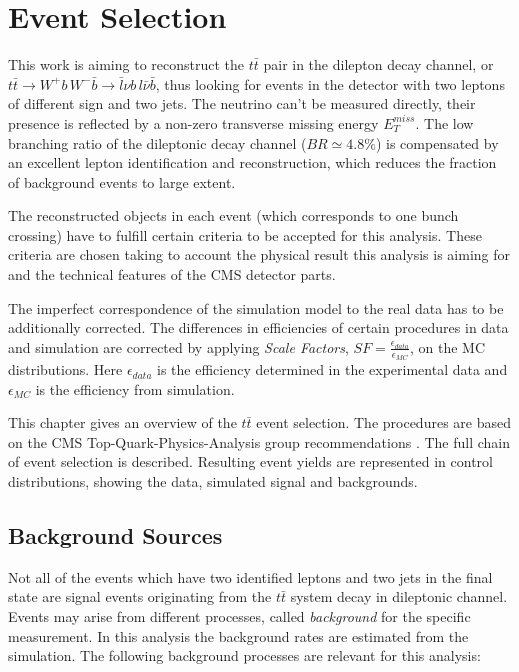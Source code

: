\chapter{Event Selection}\label{chapt:event_sel}
 
This work is aiming to reconstruct the $t\bar{t}$ pair in the dilepton decay channel, or
$t\bar{t} \to W^{+}b\,W^{-}\bar{b} \to \bar{l}\nu b\,l\bar{\nu}\bar{b}$, thus 
looking for events in the detector with two leptons of different sign and two jets. The 
neutrino can't be measured directly, their presence is reflected by a non-zero transverse
missing energy $E_{T}^{miss}$. The low branching ratio of the dileptonic decay channel
($BR \simeq 4.8\%$) is compensated by an excellent lepton identification and reconstruction, 
which reduces the fraction of background events to large extent.

The reconstructed objects in each event (which corresponds to one bunch crossing) have to fulfill certain 
criteria to be accepted for this analysis. These criteria are chosen taking to account the physical 
result this analysis is aiming for and the technical features of the CMS detector parts.

The imperfect correspondence of the simulation model to the real data has to be additionally 
corrected. The differences in efficiencies of certain procedures in data and simulation 
are corrected by applying \textit{Scale Factors}, $SF = \frac{\epsilon_{data}}{\epsilon_{MC}}$, 
on the MC distributions. Here $\epsilon_{data}$ is the efficiency determined in the experimental 
data and $\epsilon_{MC}$ is the efficiency from simulation. 

This chapter gives an overview of the $t\bar{t}$ event selection. The 
procedures are based on the CMS Top-Quark-Physics-Analysis group recommendations \cite{TopPAGreco}.
The full chain of event selection is described. 
Resulting event yields are represented in control distributions, showing the data, simulated signal and backgrounds.

\section{Background Sources}\label{sec:bg_intro}

Not all of the events which have two identified leptons and two jets in the final state are signal events
originating from the $t\bar{t}$ system decay in dileptonic channel. Events may arise from different processes, 
called \textit{background} for the specific measurement. In this analysis the background rates are estimated 
from the simulation. The following background processes are relevant for this analysis:

